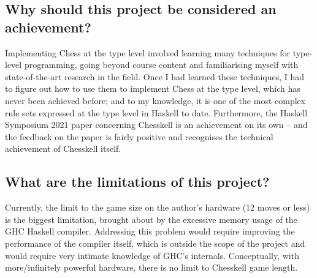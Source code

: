 \subsection{Why should this project be considered an achievement?}

Implementing Chess at the type level involved learning many techniques for type-level programming, going beyond course content and familiarising myself with state-of-the-art research in the field. Once I had learned these techniques, I had to figure out how to use them to implement Chess at the type level, which has never been achieved before; and to my knowledge, it is one of the most complex rule sets expressed at the type level in Haskell to date. Furthermore, the Haskell Symposium 2021 paper concerning Chesskell is an achievement on its own -- and the feedback on the paper is fairly positive and recognises the technical achievement of Chesskell itself.

\subsection{What are the limitations of this project?}

Currently, the limit to the game size on the author's hardware (12 moves or less) is the biggest limitation, brought about by the excessive memory usage of the GHC Haskell compiler. Addressing this problem would require improving the performance of the compiler itself, which is outside the scope of the project and would require very intimate knowledge of GHC's internals. Conceptually, with more/infinitely powerful hardware, there is no limit to Chesskell game length.
